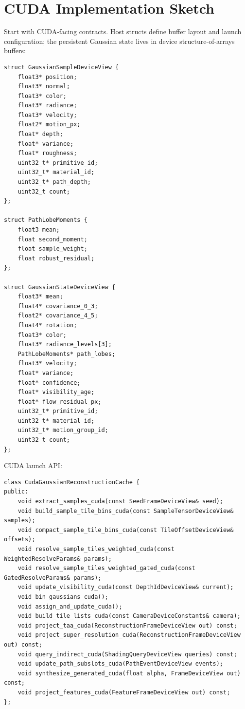 \documentclass[11pt]{article}
\begin{document}
\section{CUDA Implementation Sketch}

Start with CUDA-facing contracts. Host structs define buffer layout and launch
configuration; the persistent Gaussian state lives in device structure-of-arrays
buffers:

\begin{verbatim}
struct GaussianSampleDeviceView {
    float3* position;
    float3* normal;
    float3* color;
    float3* radiance;
    float3* velocity;
    float2* motion_px;
    float* depth;
    float* variance;
    float* roughness;
    uint32_t* primitive_id;
    uint32_t* material_id;
    uint32_t* path_depth;
    uint32_t count;
};

struct PathLobeMoments {
    float3 mean;
    float second_moment;
    float sample_weight;
    float robust_residual;
};

struct GaussianStateDeviceView {
    float3* mean;
    float4* covariance_0_3;
    float2* covariance_4_5;
    float4* rotation;
    float3* color;
    float3* radiance_levels[3];
    PathLobeMoments* path_lobes;
    float3* velocity;
    float* variance;
    float* confidence;
    float* visibility_age;
    float* flow_residual_px;
    uint32_t* primitive_id;
    uint32_t* material_id;
    uint32_t* motion_group_id;
    uint32_t count;
};
\end{verbatim}

CUDA launch API:

\begin{verbatim}
class CudaGaussianReconstructionCache {
public:
    void extract_samples_cuda(const SeedFrameDeviceView& seed);
    void build_sample_tile_bins_cuda(const SampleTensorDeviceView& samples);
    void compact_sample_tile_bins_cuda(const TileOffsetDeviceView& offsets);
    void resolve_sample_tiles_weighted_cuda(const WeightedResolveParams& params);
    void resolve_sample_tiles_weighted_gated_cuda(const GatedResolveParams& params);
    void update_visibility_cuda(const DepthIdDeviceView& current);
    void bin_gaussians_cuda();
    void assign_and_update_cuda();
    void build_tile_lists_cuda(const CameraDeviceConstants& camera);
    void project_taa_cuda(ReconstructionFrameDeviceView out) const;
    void project_super_resolution_cuda(ReconstructionFrameDeviceView out) const;
    void query_indirect_cuda(ShadingQueryDeviceView queries) const;
    void update_path_subslots_cuda(PathEventDeviceView events);
    void synthesize_generated_cuda(float alpha, FrameDeviceView out) const;
    void project_features_cuda(FeatureFrameDeviceView out) const;
};
\end{verbatim}
\end{document}
